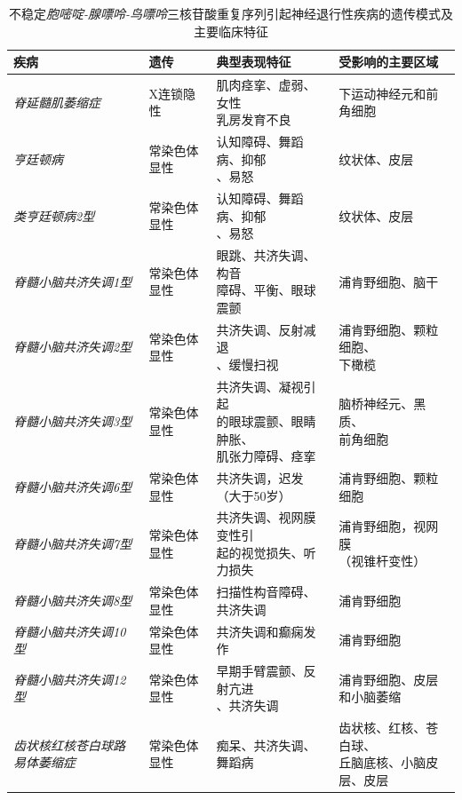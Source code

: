 \begin{table}[htbp]
	\caption{不稳定\textit{胞嘧啶-腺嘌呤-鸟嘌呤}三核苷酸重复序列引起神经退行性疾病的遗传模式及主要临床特征} \label{tab:63_1} \centering
	\begin{tabular}{llll}
		\toprule
		疾病 & 遗传 & 典型表现特征 & 受影响的主要区域\\
		\midrule
		\textit{脊延髓肌萎缩症} & X连锁隐性 & \makecell{肌肉痉挛、虚弱、女性\\乳房发育不良} & 下运动神经元和前角细胞 \\
		\textit{亨廷顿病} & 常染色体显性 & \makecell{认知障碍、舞蹈病、抑郁\\、易怒} & 纹状体、皮层 \\
		\textit{类亨廷顿病2型} & 常染色体显性 & \makecell{认知障碍、舞蹈病、抑郁\\、易怒} & 纹状体、皮层 \\
		\textit{脊髓小脑共济失调1型} & 常染色体显性 & \makecell{眼跳、共济失调、构音\\障碍、平衡、眼球震颤} & 浦肯野细胞、脑干 \\
		\textit{脊髓小脑共济失调2型} & 常染色体显性 & \makecell{共济失调、反射减退\\、缓慢扫视} & \makecell{浦肯野细胞、颗粒细胞、\\下橄榄} \\
		\textit{脊髓小脑共济失调3型} & 常染色体显性 & \makecell{共济失调、凝视引起\\的眼球震颤、眼睛肿胀、\\肌张力障碍、痉挛} & \makecell{脑桥神经元、黑质、\\前角细胞} \\
		\textit{脊髓小脑共济失调6型} & 常染色体显性 & \makecell{共济失调，迟发\\（大于50岁）} & 浦肯野细胞、颗粒细胞 \\
		\textit{脊髓小脑共济失调7型} & 常染色体显性 & \makecell{共济失调、视网膜变性引\\起的视觉损失、听力损失} & \makecell{浦肯野细胞，视网膜\\（视锥杆变性）} \\
		\textit{脊髓小脑共济失调8型} & 常染色体显性 & 扫描性构音障碍、共济失调 & 浦肯野细胞 \\
		\textit{脊髓小脑共济失调10型} & 常染色体显性 & 共济失调和癫痫发作 & 浦肯野细胞 \\
		\textit{脊髓小脑共济失调12型} & 常染色体显性 & \makecell{早期手臂震颤、反射亢进\\、共济失调} & \makecell{浦肯野细胞、皮层\\和小脑萎缩} \\
		\textit{齿状核红核苍白球路易体萎缩症} & 常染色体显性 & 痴呆、共济失调、舞蹈病 & \makecell{齿状核、红核、苍白球、\\丘脑底核、小脑皮层、皮层} \\
		\bottomrule
	\end{tabular}
\end{table}


